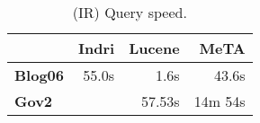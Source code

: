 \begin{table}[t]
\centering
{\small
\begin{tabular}{|l|r|r|r|}
    \hline & \textbf{Indri} & \textbf{Lucene} & \textbf{MeTA} \\
    \hline
    \textbf{Blog06} & 55.0s & 1.6s & 43.6s \\
    \textbf{Gov2} & & 57.53s & 14m 54s \\
    \hline
\end{tabular}
\caption{(IR) Query speed.}
\label{table:ir-query-speed}
}
\end{table}
